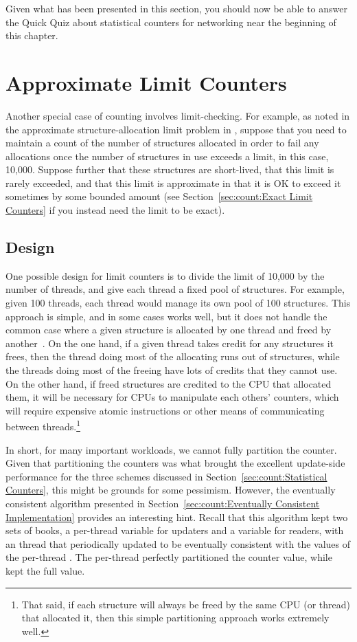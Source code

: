 Given what has been presented in this section, you should now be able
to answer the Quick Quiz about statistical counters for networking
near the beginning of this chapter.

\section{Approximate Limit Counters}
\label{sec:count:Approximate Limit Counters}

Another special case of counting involves limit-checking.
For example, as noted in the approximate structure-allocation limit
problem in {\QQapproxcnt},
suppose that you need to maintain a count of the number of
structures allocated in order to fail any allocations once the number
of structures in use exceeds a limit, in this case, 10,000.
Suppose further that these structures are short-lived, that this
limit is rarely exceeded, and that this limit is approximate in
that it is OK to exceed it sometimes by some bounded amount
(see Section~\ref{sec:count:Exact Limit Counters}
if you instead need the limit to be exact).

\subsection{Design}

One possible design for limit counters is to divide the limit of 10,000
by the number of threads, and give each thread a fixed pool of structures.
For example, given 100 threads, each thread would manage its own pool
of 100 structures.
This approach is simple, and in some cases works well, but it does not
handle the common case where a given structure is allocated by one
thread and freed by another~\cite{McKenney93}.
On the one hand, if a given thread takes credit for any structures it
frees, then the thread doing most of the allocating runs out
of structures, while the threads doing most of the freeing have lots
of credits that they cannot use.
On the other hand, if freed structures are credited to the CPU that
allocated them, it will be necessary for CPUs to manipulate each
others' counters, which will require expensive atomic instructions
or other means of communicating between threads.\footnote{
	That said, if each structure will always be freed
	by the same CPU (or thread) that allocated it, then
	this simple partitioning approach works extremely well.}

In short, for many important workloads, we cannot fully partition the counter.
Given that partitioning the counters was what brought the excellent
update-side performance for the three schemes discussed in
Section~\ref{sec:count:Statistical Counters}, this might be grounds
for some pessimism.
However, the eventually consistent algorithm presented in
Section~\ref{sec:count:Eventually Consistent Implementation}
provides an interesting hint.
Recall that this algorithm kept two sets of books, a
per-thread  variable for updaters and a 
variable for readers, with an  thread that periodically
updated  to be eventually consistent with the values
of the per-thread .
The per-thread  perfectly partitioned the counter value, while
 kept the full value.

